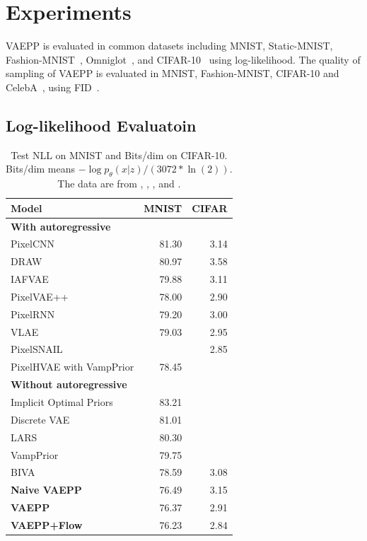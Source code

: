 \section{Experiments}
VAEPP is evaluated in common datasets including MNIST, Static-MNIST\cite{larochelle2011neural}, Fashion-MNIST~\cite{xiao2017/online}, Omniglot~\cite{lake2015human}, and CIFAR-10~\cite{krizhevsky2009learning} using log-likelihood. The quality of sampling of VAEPP is evaluated in MNIST, Fashion-MNIST, CIFAR-10 and CelebA~\cite{liu2015deep}, using FID~\cite{heusel2017gans}.
\subsection{Log-likelihood Evaluatoin}
\begin{table}[tb]
\centering
\begin{tabular}{lrr}  
\toprule
Model  &  MNIST & CIFAR\\
\midrule
\textbf{With autoregressive}   \\
PixelCNN         &  81.30  &  3.14   \\
DRAW             &  80.97  &  3.58    \\
IAFVAE           &  79.88  &  3.11    \\
PixelVAE++       &  78.00  &  2.90   \\
PixelRNN         &  79.20  &  3.00    \\
VLAE             &  79.03  &  2.95     \\
PixelSNAIL       &         & 2.85      \\
PixelHVAE with VampPrior &  78.45  &     \\
\midrule
\textbf{Without autoregressive}   \\
Implicit Optimal Priors & 83.21 \\
Discrete VAE     &  81.01     \\
LARS             &  80.30     \\
VampPrior        &  79.75     \\
BIVA            &  78.59      &    3.08    \\
\textbf{Naive VAEPP}      &  76.49 & 3.15    \\
\textbf{VAEPP}            &  76.37 & 2.91	    \\
\textbf{VAEPP+Flow}       &  76.23 & 2.84    \\
\bottomrule
\end{tabular}
\caption{Test NLL on MNIST and Bits/dim on CIFAR-10. Bits/dim means $-\log p_\theta(x|z) / (3072 * \ln(2))$. The data are from \protect\cite{maaloe2019biva},  \protect\cite{chen2018pixelsnail}, \protect\cite{tomczak2018vae}, \protect\cite{bauer2019resampled} and \protect\cite{takahashi2019variational}. 
}
\end{table}
